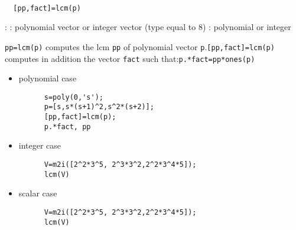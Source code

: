 
\begin{mandesc}
   \\ %
\end{mandesc}
\begin{calling_sequence}
\begin{verbatim}
  [pp,fact]=lcm(p)  
\end{verbatim}
\end{calling_sequence}
\begin{parameters}
  \begin{varlist}
    :
    : polynomial vector or integer vector (type equal to 8)
    : polynomial or integer
  \end{varlist}
\end{parameters}
\begin{mandescription}
  \verb!pp=lcm(p)! computes the lcm \verb!pp! of polynomial vector \verb!p!.\verb![pp,fact]=lcm(p)! computes in addition the vector \verb!fact! such that:\verb!p.*fact=pp*ones(p)!
\end{mandescription}
\begin{examples}
  \begin{itemize}
  \item polynomial case
    \begin{Verbatim}
      s=poly(0,'s');
      p=[s,s*(s+1)^2,s^2*(s+2)];
      [pp,fact]=lcm(p);
      p.*fact, pp
    \end{Verbatim}
  \item integer case
    \begin{Verbatim}
      V=m2i([2^2*3^5, 2^3*3^2,2^2*3^4*5]);
      lcm(V)
    \end{Verbatim}
  \item scalar case
    \begin{Verbatim}
      V=m2i([2^2*3^5, 2^3*3^2,2^2*3^4*5]);
      lcm(V)
    \end{Verbatim}
  \end{itemize}
\end{examples}
\begin{manseealso}
     
\end{manseealso}
